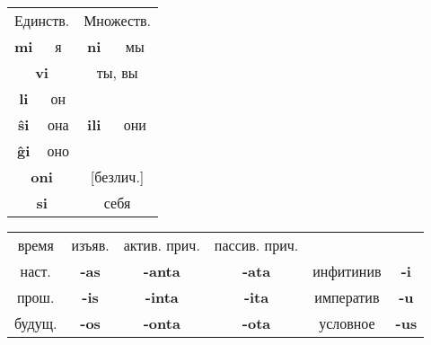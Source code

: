 \documentclass{article}
\def\b#1{\textbf{#1}}
\begin{document}
\begin{tabular}{cccc}
\multicolumn{2}{c}{Единств.} & \multicolumn{2}{c}{Множеств.} \\
\b{mi} & я & \b{ni} & мы \\
\multicolumn{2}{c}{\b{vi}} & \multicolumn{2}{c}{ты, вы} \\
\b{li} & он & & \\
\b{ŝi} & она & \b{ili} & они \\
\b{ĝi} & оно & & \\	 
\multicolumn{2}{c}{\b{oni}} & \multicolumn{2}{c}{[безлич.]} \\
\multicolumn{2}{c}{\b{si}} & \multicolumn{2}{c}{себя} \\
\end{tabular}
\begin{tabular}{cccccc}
время & изъяв. & актив. прич. & пассив. прич. & ~ & ~ \\
наст. & \b{-as} & \b{-anta} & \b{-ata} & инфитинив & \b{-i} \\
прош. & \b{-is} & \b{-inta} & \b{-ita} & императив & \b{-u} \\
будущ. & \b{-os} & \b{-onta} & \b{-ota} & условное & \b{-us} \\
\end{tabular}
\end{document}
